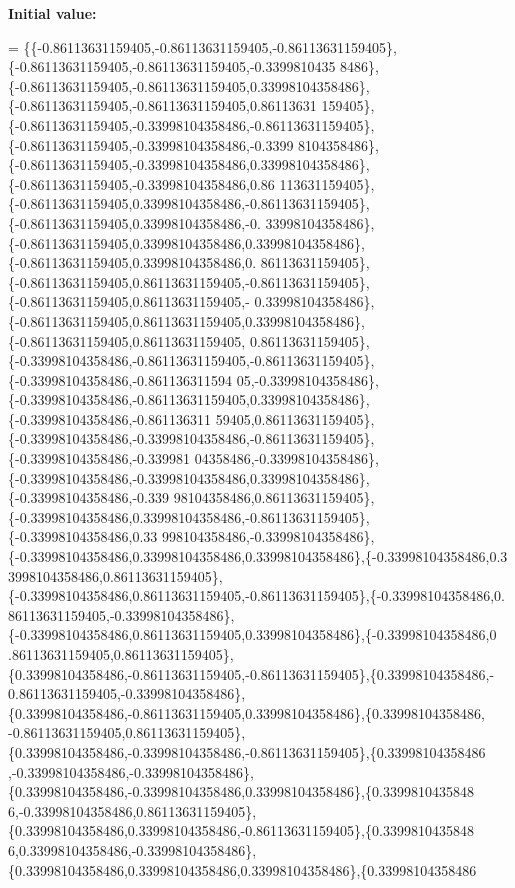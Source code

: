 {\bfseries Initial value\+:}
\begin{DoxyCode}
= 
\{\{-0.86113631159405,-0.86113631159405,-0.86113631159405\},\{-0.86113631159405,-0.86113631159405,-0.3399810435
      8486\},\{-0.86113631159405,-0.86113631159405,0.33998104358486\},\{-0.86113631159405,-0.86113631159405,0.86113631
      159405\},\{-0.86113631159405,-0.33998104358486,-0.86113631159405\},\{-0.86113631159405,-0.33998104358486,-0.3399
      8104358486\},\{-0.86113631159405,-0.33998104358486,0.33998104358486\},\{-0.86113631159405,-0.33998104358486,0.86
      113631159405\},\{-0.86113631159405,0.33998104358486,-0.86113631159405\},\{-0.86113631159405,0.33998104358486,-0.
      33998104358486\},\{-0.86113631159405,0.33998104358486,0.33998104358486\},\{-0.86113631159405,0.33998104358486,0.
      86113631159405\},\{-0.86113631159405,0.86113631159405,-0.86113631159405\},\{-0.86113631159405,0.86113631159405,-
      0.33998104358486\},\{-0.86113631159405,0.86113631159405,0.33998104358486\},\{-0.86113631159405,0.86113631159405,
      0.86113631159405\},\{-0.33998104358486,-0.86113631159405,-0.86113631159405\},\{-0.33998104358486,-0.861136311594
      05,-0.33998104358486\},\{-0.33998104358486,-0.86113631159405,0.33998104358486\},\{-0.33998104358486,-0.861136311
      59405,0.86113631159405\},\{-0.33998104358486,-0.33998104358486,-0.86113631159405\},\{-0.33998104358486,-0.339981
      04358486,-0.33998104358486\},\{-0.33998104358486,-0.33998104358486,0.33998104358486\},\{-0.33998104358486,-0.339
      98104358486,0.86113631159405\},\{-0.33998104358486,0.33998104358486,-0.86113631159405\},\{-0.33998104358486,0.33
      998104358486,-0.33998104358486\},\{-0.33998104358486,0.33998104358486,0.33998104358486\},\{-0.33998104358486,0.3
      3998104358486,0.86113631159405\},\{-0.33998104358486,0.86113631159405,-0.86113631159405\},\{-0.33998104358486,0.
      86113631159405,-0.33998104358486\},\{-0.33998104358486,0.86113631159405,0.33998104358486\},\{-0.33998104358486,0
      .86113631159405,0.86113631159405\},\{0.33998104358486,-0.86113631159405,-0.86113631159405\},\{0.33998104358486,-
      0.86113631159405,-0.33998104358486\},\{0.33998104358486,-0.86113631159405,0.33998104358486\},\{0.33998104358486,
      -0.86113631159405,0.86113631159405\},\{0.33998104358486,-0.33998104358486,-0.86113631159405\},\{0.33998104358486
      ,-0.33998104358486,-0.33998104358486\},\{0.33998104358486,-0.33998104358486,0.33998104358486\},\{0.3399810435848
      6,-0.33998104358486,0.86113631159405\},\{0.33998104358486,0.33998104358486,-0.86113631159405\},\{0.3399810435848
      6,0.33998104358486,-0.33998104358486\},\{0.33998104358486,0.33998104358486,0.33998104358486\},\{0.33998104358486

\end{DoxyCode}
